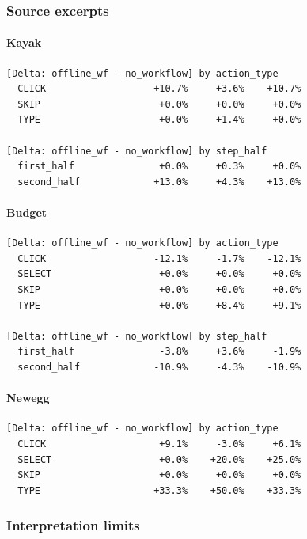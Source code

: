 \subsubsection{Source excerpts}

\paragraph{Kayak}

\begin{verbatim}
[Delta: offline_wf - no_workflow] by action_type
  CLICK                   +10.7%     +3.6%    +10.7%
  SKIP                     +0.0%     +0.0%     +0.0%
  TYPE                     +0.0%     +1.4%     +0.0%

[Delta: offline_wf - no_workflow] by step_half
  first_half               +0.0%     +0.3%     +0.0%
  second_half             +13.0%     +4.3%    +13.0%
\end{verbatim}

\paragraph{Budget}

\begin{verbatim}
[Delta: offline_wf - no_workflow] by action_type
  CLICK                   -12.1%     -1.7%    -12.1%
  SELECT                   +0.0%     +0.0%     +0.0%
  SKIP                     +0.0%     +0.0%     +0.0%
  TYPE                     +0.0%     +8.4%     +9.1%

[Delta: offline_wf - no_workflow] by step_half
  first_half               -3.8%     +3.6%     -1.9%
  second_half             -10.9%     -4.3%    -10.9%
\end{verbatim}

\paragraph{Newegg}

\begin{verbatim}
[Delta: offline_wf - no_workflow] by action_type
  CLICK                    +9.1%     -3.0%     +6.1%
  SELECT                   +0.0%    +20.0%    +25.0%
  SKIP                     +0.0%     +0.0%     +0.0%
  TYPE                    +33.3%    +50.0%    +33.3%
\end{verbatim}

\subsubsection{Interpretation limits}

